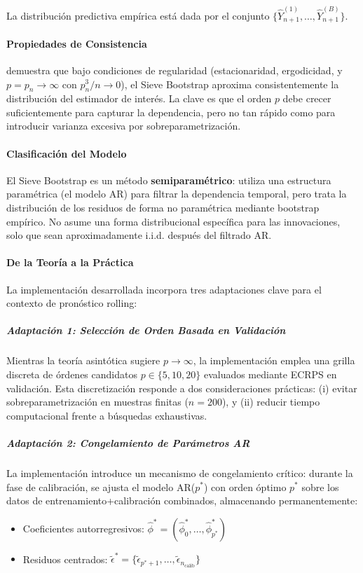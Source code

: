 La distribución predictiva empírica está dada por el conjunto $\{\hat{Y}_{n+1}^{(1)}, \dots, \hat{Y}_{n+1}^{(B)}\}$.

\paragraph{Propiedades de Consistencia}
\textcite{Buhlmann1997} demuestra que bajo condiciones de regularidad (estacionaridad, ergodicidad, y $p = p_n \to \infty$ con $p_n^3/n \to 0$), el Sieve Bootstrap aproxima consistentemente la distribución del estimador de interés. La clave es que el orden $p$ debe crecer suficientemente para capturar la dependencia, pero no tan rápido como para introducir varianza excesiva por sobreparametrización.

\paragraph{Clasificación del Modelo}
El Sieve Bootstrap es un método \textbf{semiparamétrico}: utiliza una estructura paramétrica (el modelo AR) para filtrar la dependencia temporal, pero trata la distribución de los residuos de forma no paramétrica mediante bootstrap empírico. No asume una forma distribucional específica para las innovaciones, solo que sean aproximadamente i.i.d. después del filtrado AR.

\paragraph{De la Teoría a la Práctica}

La implementación desarrollada incorpora tres adaptaciones clave para el contexto de pronóstico rolling:

\subparagraph{Adaptación 1: Selección de Orden Basada en Validación}
Mientras la teoría asintótica sugiere $p \to \infty$, la implementación emplea una grilla discreta de órdenes candidatos $p \in \{5, 10, 20\}$ evaluados mediante ECRPS en validación. Esta discretización responde a dos consideraciones prácticas: (i) evitar sobreparametrización en muestras finitas ($n = 200$), y (ii) reducir tiempo computacional frente a búsquedas exhaustivas.

\subparagraph{Adaptación 2: Congelamiento de Parámetros AR}
La implementación introduce un mecanismo de congelamiento crítico: durante la fase de calibración, se ajusta el modelo AR($p^*$) con orden óptimo $p^*$ sobre los datos de entrenamiento+calibración combinados, almacenando permanentemente:
\begin{itemize}
    \item Coeficientes autorregresivos: $\hat{\phi}^* = (\hat{\phi}_0^*, \dots, \hat{\phi}_{p^*}^*)$
    \item Residuos centrados: $\tilde{\epsilon}^* = \{\tilde{\epsilon}_{p^*+1}, \dots, \tilde{\epsilon}_{n_{\text{calib}}}\}$
\end{itemize}

